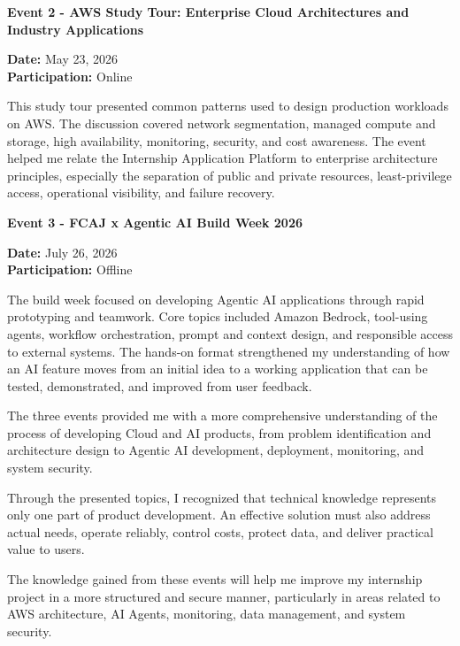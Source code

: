 \vspace{0.5em}\noindent\textbf{Event 2 - AWS Study Tour: Enterprise Cloud Architectures
and Industry
Applications}\par

\textbf{Date:} May 23, 2026\\
\textbf{Participation:} Online

This study tour presented common patterns used to design production
workloads on AWS. The discussion covered network segmentation, managed
compute and storage, high availability, monitoring, security, and cost
awareness. The event helped me relate the Internship Application
Platform to enterprise architecture principles, especially the
separation of public and private resources, least-privilege access,
operational visibility, and failure recovery.

\vspace{0.5em}\noindent\textbf{Event 3 - FCAJ x Agentic AI Build Week
2026}\par

\textbf{Date:} July 26, 2026\\
\textbf{Participation:} Offline

The build week focused on developing Agentic AI applications through
rapid prototyping and teamwork. Core topics included Amazon Bedrock,
tool-using agents, workflow orchestration, prompt and context design,
and responsible access to external systems. The hands-on format
strengthened my understanding of how an AI feature moves from an initial
idea to a working application that can be tested, demonstrated, and
improved from user feedback.

The three events provided me with a more comprehensive understanding of
the process of developing Cloud and AI products, from problem
identification and architecture design to Agentic AI development,
deployment, monitoring, and system security.

Through the presented topics, I recognized that technical knowledge
represents only one part of product development. An effective solution
must also address actual needs, operate reliably, control costs, protect
data, and deliver practical value to users.

The knowledge gained from these events will help me improve my
internship project in a more structured and secure manner, particularly
in areas related to AWS architecture, AI Agents, monitoring, data
management, and system security.
